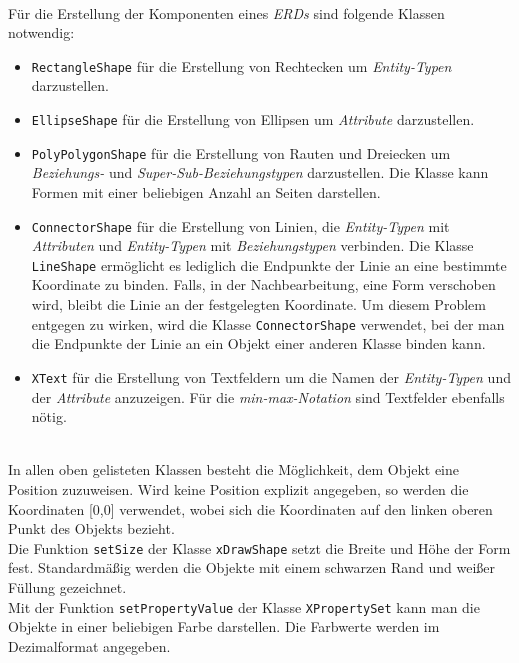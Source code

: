\noindent
\hon{}
\\
\noindent
Für die Erstellung der Komponenten eines \textit{ERDs} sind folgende Klassen notwendig:
\begin{itemize}
	\item \verb|RectangleShape| für die Erstellung von Rechtecken um  \textit{Entity-Typen} darzustellen.
	\item \verb|EllipseShape| für die Erstellung von Ellipsen um \textit{Attribute} darzustellen.
	\item \verb|PolyPolygonShape| für die Erstellung von Rauten und Dreiecken um \textit{Beziehungs-} und \textit{Super-Sub-Beziehungstypen} darzustellen. Die Klasse kann Formen mit einer beliebigen Anzahl an Seiten darstellen. 
	\item \verb|ConnectorShape| für die Erstellung von Linien, die \textit{Entity-Typen} mit \textit{Attributen} und \textit{Entity-Typen} mit \textit{Beziehungstypen} verbinden. Die Klasse \verb|LineShape| ermöglicht es lediglich die Endpunkte der Linie an eine bestimmte Koordinate zu binden. Falls, in der Nachbearbeitung, eine Form verschoben wird, bleibt die Linie an der festgelegten Koordinate. Um diesem Problem entgegen zu wirken, wird die Klasse \verb|ConnectorShape| verwendet, bei der man die Endpunkte der Linie an ein Objekt einer anderen Klasse binden kann. 
	\item \verb|XText| für die Erstellung von Textfeldern um die Namen der \textit{Entity-Typen} und der \textit{Attribute} anzuzeigen. Für die \textit{min-max-Notation} sind Textfelder ebenfalls nötig.
\end{itemize}
\noindent
\hon{}
\\
\noindent
In allen oben gelisteten Klassen besteht die Möglichkeit, dem Objekt eine Position zuzuweisen. Wird keine Position explizit angegeben, so werden die Koordinaten [0,0] verwendet, wobei sich die Koordinaten auf den linken oberen Punkt des Objekts bezieht. 
\\
\noindent
Die Funktion \verb|setSize| der Klasse \verb|xDrawShape| setzt die Breite und Höhe der Form fest.
Standardmäßig werden die Objekte mit einem schwarzen Rand und weißer Füllung gezeichnet. 
\\
\noindent
Mit der Funktion \verb|setPropertyValue| der Klasse \verb|XPropertySet| kann man die Objekte in einer beliebigen Farbe darstellen. Die Farbwerte werden im Dezimalformat angegeben.
\\

